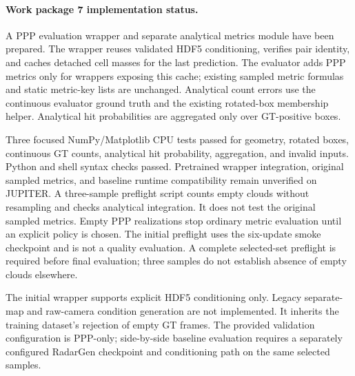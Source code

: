 \paragraph{Work package 7 implementation status.}
A PPP evaluation wrapper and separate analytical metrics module have been
prepared. The wrapper reuses validated HDF5 conditioning, verifies pair identity,
and caches detached cell masses for the last prediction. The evaluator adds PPP
metrics only for wrappers exposing this cache; existing sampled metric formulas
and static metric-key lists are unchanged. Analytical count errors use the
continuous evaluator ground truth and the existing rotated-box membership helper.
Analytical hit probabilities are aggregated only over GT-positive boxes.

Three focused NumPy/Matplotlib CPU tests passed for geometry, rotated boxes,
continuous GT counts, analytical hit probability, aggregation, and invalid inputs.
Python and shell syntax checks passed. Pretrained wrapper integration, original
sampled metrics, and baseline runtime compatibility remain unverified on JUPITER.
A three-sample preflight script counts empty clouds without resampling and checks
analytical integration. It does not test the original sampled metrics. Empty
PPP realizations stop ordinary metric evaluation until an explicit policy is
chosen. The initial preflight uses the six-update smoke checkpoint and is not a
quality evaluation. A complete selected-set preflight is required before final
evaluation; three samples do not establish absence of empty clouds elsewhere.

The initial wrapper supports explicit HDF5 conditioning only. Legacy separate-map
and raw-camera condition generation are not implemented. It inherits the training
dataset's rejection of empty GT frames. The provided validation configuration is
PPP-only; side-by-side baseline evaluation requires a separately configured
RadarGen checkpoint and conditioning path on the same selected samples.

